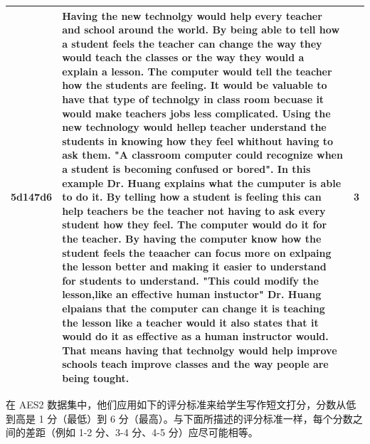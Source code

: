 \begin{table}[htbp]
\begin{tabular}{cp{13.3cm}c}
5d147d6 & Having the new technolgy would   help every teacher and school around the world. By being able to tell how a   student feels the teacher can change the way they would teach the classes or   the way they would a explain a lesson. The computer would tell the teacher   how the students are feeling. It would be valuable to have that type of   technolgy in class room becuase it would make teachers jobs less   complicated. Using the new technology would hellep teacher understand the   students in knowing how they feel whithout having to ask them. "A   classroom computer could recognize when a student is becoming confused or   bored". In this example Dr. Huang explains what the cumputer is able to   do it. By telling how a student is feeling this can help teachers be the   teacher not having to ask every student how they feel. The computer would do   it for the teacher. By having the computer know how the student feels the   teaacher can focus more on exlpaing the lesson better and making it easier to   understand for students to understand. "This could modify the   lesson,like an effective human instuctor" Dr. Huang elpaians that   the computer can change it is teaching the lesson like a teacher would it   also states that it would do it as effective as a human instructor would.   That means having that technolgy would help improve schools teach improve   classes and the way people are being tought. & 3  \\ \bottomrule
\end{tabular}
\end{table}

在 AES2 数据集中，他们应用如下的评分标准来给学生写作短文打分，分数从低到高是 1 分（最低）到 6 分（最高）。与下面所描述的评分标准一样，每个分数之间的差距（例如 1-2 分、3-4 分、4-5 分）应尽可能相等。

